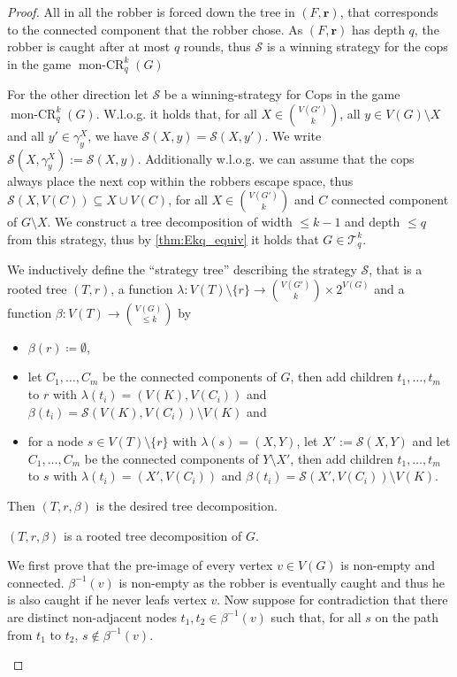 \documentclass[a4paper,UKenglish,cleveref, autoref, thm-restate]{lipics-v2021}
\newcommand{\Ekq}{\ensuremath{\mathcal{T}_{q}^{k}}}
\DeclareMathOperator{\monCR}{mon-CR}
\renewcommand{\vec}[1]{\ensuremath{\boldsymbol{#1}}}
\begin{document}
\begin{proof}
	All in all the robber is forced down the tree in $(F,\vec{r})$, that corresponds to the connected component that the robber chose. As $(F,\vec{r})$ has depth $q$, the robber is caught after at most $q$ rounds, thus $\mathcal{S}$ is a winning strategy for the cops in the game $\monCR_q^k(G)$
	
	For the other direction let $\mathcal{S}$ be a winning-strategy for Cops in the game $\monCR_q^k(G)$.
	W.l.o.g. it holds that, for all $X\in\binom{V(G')}{k}$, all $y\in V(G)\setminus X$ and all $y'\in \gamma_y^X$, we have $\mathcal{S}(X,y)=\mathcal{S}(X,y')$.
	We write $\mathcal{S}(X,\gamma_y^X):=\mathcal{S}(X,y)$.
	Additionally w.l.o.g. we can assume that the cops always place the next cop within the robbers escape space, thus $\mathcal{S}(X,V(C))\subseteq X\cup V(C)$, for all $X\in\binom{V(G')}{k}$ and $C$ connected component of $G\setminus X$.
	We construct a tree decomposition of width $\leq k-1$ and depth $\leq q$ from this strategy, thus by \cref{thm:Ekq_equiv} it holds that $G\in\Ekq$.
	
	We inductively define the ``strategy tree'' describing the strategy $\mathcal{S}$, that is a rooted tree $(T,r)$, a function $\lambda\colon V(T)\setminus\{r\}\to \binom{V(G')}{k}\times 2^{V(G)}$ and a function $\beta\colon V(T)\rightarrow \binom{V(G)}{\leq k}$ by
	\begin{itemize}
		\item $\beta(r)\coloneqq \emptyset$,
		\item let $C_1,\ldots,C_m$ be the connected components of $G$, then add children $t_1,\ldots,t_m$ to $r$ with $\lambda(t_i)=(V(K),V(C_i))$ and $\beta(t_i)=\mathcal{S}(V(K),V(C_i))\setminus V(K)$ and
		\item for a node $s\in V(T)\setminus\{r\}$ with $\lambda(s)=(X,Y)$, let $X':=\mathcal{S}(X,Y)$ and let $C_1,\ldots,C_m$ be the connected components of $Y\setminus X'$, then add children $t_1,\ldots,t_m$ to $s$ with $\lambda(t_i)=(X',V(C_i))$ and $\beta(t_i)=\mathcal{S}(X',V(C_i))\setminus V(K)$.
	\end{itemize}
	Then $(T,r,\beta)$ is the desired tree decomposition. 

	\begin{claim}
		$(T,r,\beta)$ is a rooted tree decomposition of $G$.
	\end{claim}
	
	\begin{claimproof}
		We first prove that the pre-image of every vertex $v\in V(G)$ is non-empty and connected.
		$\beta^{-1}(v)$ is non-empty as the robber is eventually caught and thus he is also caught if he never leafs vertex $v$.
		Now suppose for contradiction that there are distinct non-adjacent nodes $t_1,t_2\in\beta^{-1}(v)$ such that, for all $s$ on the path from $t_1$ to $t_2$, $s\not\in\beta^{-1}(v)$.
		

\end{claimproof}
\end{proof}
\end{document}
